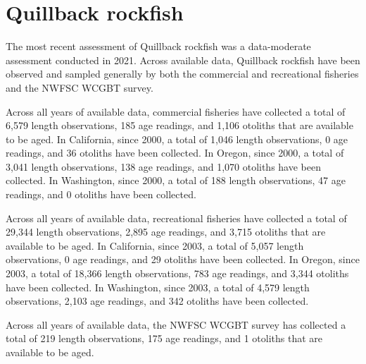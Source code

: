 \documentclass[11pt,
  english,
  letterpaper,
]{article}
\begin{document}

\hypertarget{quillback-rockfish}{%
\section{Quillback rockfish}\label{quillback-rockfish}}

\leavevmode\tagmcend\tagstructend


The most recent assessment of Quillback rockfish was a data-moderate assessment conducted in 2021. Across available data, Quillback rockfish have been observed and sampled generally by both the commercial and recreational fisheries and the NWFSC WCGBT survey.

\leavevmode\tagmcend\tagstructend\par


Across all years of available data, commercial fisheries have collected a total of 6,579 length observations, 185 age readings, and 1,106 otoliths that are available to be aged. In California, since 2000, a total of 1,046 length observations, 0 age readings, and 36 otoliths have been collected. In Oregon, since 2000, a total of 3,041 length observations, 138 age readings, and 1,070 otoliths have been collected. In Washington, since 2000, a total of 188 length observations, 47 age readings, and 0 otoliths have been collected.

\leavevmode\tagmcend\tagstructend\par


Across all years of available data, recreational fisheries have collected a total of 29,344 length observations, 2,895 age readings, and 3,715 otoliths that are available to be aged. In California, since 2003, a total of 5,057 length observations, 0 age readings, and 29 otoliths have been collected. In Oregon, since 2003, a total of 18,366 length observations, 783 age readings, and 3,344 otoliths have been collected. In Washington, since 2003, a total of 4,579 length observations, 2,103 age readings, and 342 otoliths have been collected.

\leavevmode\tagmcend\tagstructend\par


Across all years of available data, the NWFSC WCGBT survey has collected a total of 219 length observations, 175 age readings, and 1 otoliths that are available to be aged.
\end{document}
